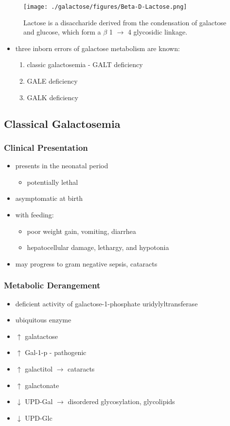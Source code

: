 \documentclass{scrartcl}
\begin{document}
\begin{figure}[htbp]
\centering
\texttt{[image: ./galactose/figures/Beta-D-Lactose.png]}
\caption[lactose]{\label{fig:orgbb7ae23}
Lactose is a disaccharide derived from the condensation of galactose and glucose, which form a \(\beta\) 1 \(\to\) 4 glycosidic linkage.}
\end{figure}

\begin{itemize}
\item three inborn errors of galactose metabolism are known:
\begin{enumerate}
\item classic galactosemia - GALT deficiency
\item GALE deficiency
\item GALK deficiency
\end{enumerate}
\end{itemize}

\subsection{Classical Galactosemia}
\label{sec:org0db0d51}
\subsubsection{Clinical Presentation}
\label{sec:org103cb0e}
\begin{itemize}
\item presents in the neonatal period
\begin{itemize}
\item potentially lethal
\end{itemize}
\item asymptomatic at birth
\item with feeding:
\begin{itemize}
\item poor weight gain, vomiting, diarrhea
\item hepatocellular damage, lethargy, and hypotonia
\end{itemize}
\item may progress to gram negative sepsis, cataracts
\end{itemize}

\subsubsection{Metabolic Derangement}
\label{sec:org6aa6841}
\begin{itemize}
\item deficient activity of galactose-1-phosphate uridylyltransferase
\item ubiquitous enzyme
\item \(\uparrow\)  galatactose
\item \(\uparrow\) Gal-1-p - pathogenic
\item \(\uparrow\)  galactitol \(\to\) cataracts
\item \(\uparrow\) galactonate
\item \(\downarrow\) UPD-Gal \(\to\) disordered glycosylation, glycolipids
\item \(\downarrow\) UPD-Glc
\end{itemize}
\end{document}
